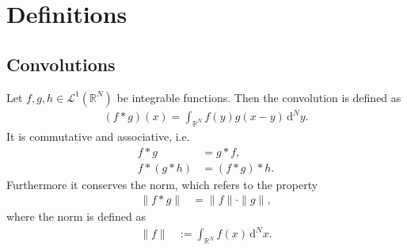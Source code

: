 \documentclass[german, parskip=full]{scrartcl}
\title{\titel}
\author{\autor}
\date{\today}
\newcommand{\intr}{}
\begin{document}
\maketitle  %

\section{Definitions}
\subsection{Convolutions}
Let $f,g,h\in\mathcal{L}^1(\mathbb{R}^N)$ be integrable functions.
Then the convolution is defined as
\begin{align}
(f\ast g)(x)=\intr\int_{\mathbb{R}^{N }}{f(y)g(x-y)}\,\mathrm{d}^{N }y. \label{eqn:ConvolutionDefinition}
\end{align}
It is commutative and associative, i.e.
\begin{align}
f\ast g &= g\ast f, \label{eqn:ConvolutionCommutative}\\
f\ast (g\ast h)&=(f\ast g)\ast h. \label{eqn:ConvolutionAssociative}
\end{align}
Furthermore it conserves the norm, which refers to the property
\begin{align}
\|f\ast g\|&=\|f\|\cdot\|g\|, \label{eqn:ConvolutionNormProperty}
\end{align}
where the norm is defined as
\begin{align}
\|f\|&:=\intr\int_{\mathbb{R}^{N }}{f(x)}\,\mathrm{d}^{N}x. \label{eqn:NormDefinition}
\end{align}
\end{document}
